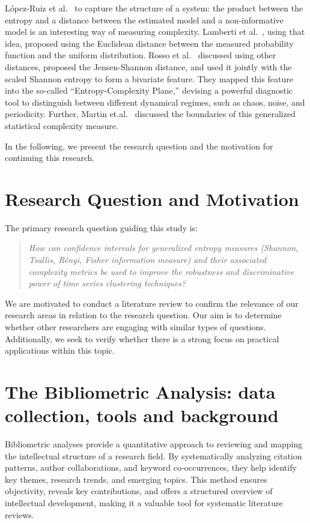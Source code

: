 López-Ruiz et al.~\cite{lopez1995statistical} to capture the structure of a system:
the product between the entropy and a distance between the estimated model and a non-informative model is an interesting way of measuring complexity.
Lamberti et al.~\cite{lamberti2004intensive}, using that idea, proposed using the Euclidean distance between the measured probability function and the uniform distribution.
Rosso et al.~\cite{EEGAnalysisUsingWaveletBasedInformationTools} discussed using other distances, proposed the Jensen-Shannon distance, and used it jointly with the scaled Shannon entropy to form a bivariate feature.
They mapped this feature into the so-called ``Entropy-Complexity Plane,'' devising  a powerful diagnostic tool to distinguish between different dynamical regimes, such as chaos, noise, and periodicity.
Further, Martin et.al.~\cite{Martin2006} discussed the boundaries of this generalized statistical complexity measure. 

In the following, we present the research question and the motivation for continuing this research. 

\section{Research Question and Motivation}\label{Sec:ResearchQuestion}

The primary research question guiding this study is:
\begin{quote}
	\textit{How can confidence intervals for generalized entropy measures (Shannon, Tsallis, Rényi, Fisher information measure) and their associated complexity metrics be used to improve the robustness and discriminative power of time series clustering techniques?}
\end{quote}

We are motivated to conduct a literature review to confirm the relevance of our research areas in relation to the research question. Our aim is to determine whether other researchers are engaging with similar types of questions. Additionally, we seek to verify whether there is a strong focus on practical applications within this topic. 


\section{The Bibliometric Analysis: data collection, tools and background}\label{Sec:BiblioIntro}

Bibliometric analyses provide a quantitative approach to reviewing and mapping the intellectual structure of a research field. By systematically analyzing citation patterns, author collaborations, and keyword co-occurrences, they help identify key themes, research trends, and emerging topics. This method ensures objectivity, reveals key contributions, and offers a structured overview of intellectual development, making it a valuable tool for systematic literature reviews.

